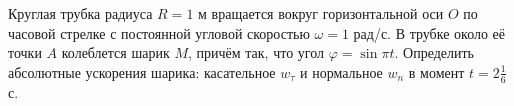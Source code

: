 Круглая трубка радиуса $R = 1$ м вращается вокруг горизонтальной оси $O$
по часовой стрелке с постоянной угловой скоростью $\omega = 1$ рад/с.
В трубке около её точки $A$ колеблется шарик $M$,
причём так, что угол $\varphi = \sin{\pi t}$.
Определить абсолютные ускорения шарика:
касательное $w_{\tau}$ и нормальное $w_n$
в момент $t = 2 \frac{1}{6}$ с.
